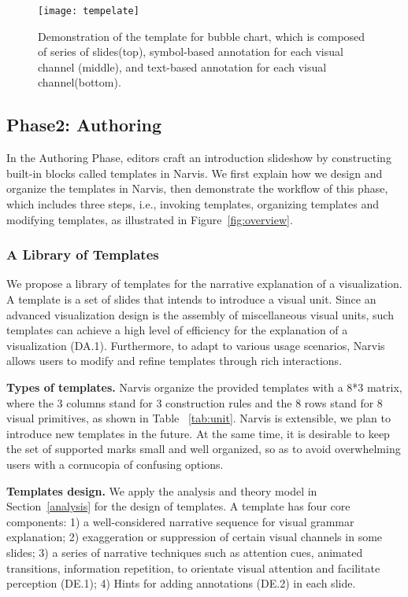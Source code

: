 \begin{figure}
 \centering 
 \texttt{[image: tempelate]}
 \caption{Demonstration of the template for bubble chart, which is composed of series of slides(top), symbol-based annotation for each visual channel (middle), and text-based annotation for each visual channel(bottom). }
 \label{fig:template}
\end{figure}


\subsection{Phase2: Authoring}
In the Authoring Phase, editors craft an introduction slideshow by constructing built-in blocks called templates in Narvis. We first explain how we design and organize the templates in Narvis, then demonstrate the workflow of this phase, which includes three steps, i.e., invoking templates, organizing templates and modifying templates, as illustrated in Figure~\ref{fig:overview}. 

\subsubsection{A Library of Templates}
We propose a library of templates for the narrative explanation of a visualization. A template is a set of slides that intends to introduce a visual unit. Since an advanced visualization design is the assembly of miscellaneous visual units, such templates can achieve a high level of efficiency for the explanation of a visualization (DA.1). Furthermore, to adapt to various usage scenarios, Narvis allows users to modify and refine templates through rich interactions.

\noindent
\textbf{Types of templates.}
Narvis organize the provided templates with a 8*3 matrix, where the 3 columns stand for 3 construction rules and the 8 rows stand for  8 visual primitives, as shown in Table ~\ref{tab:unit}. Narvis is extensible, we plan to introduce new templates in the future. At the same time, it is desirable to keep the set of supported marks small and well organized, so as to avoid overwhelming users with a cornucopia of confusing options.

\noindent
\textbf{Templates design.}
We apply the analysis and theory model in Section~\ref{analysis} for the design of templates. A template has four core components: 1) a well-considered narrative sequence for visual grammar explanation; 2) exaggeration or suppression of certain visual channels in some slides; 3) a series of narrative techniques such as attention cues, animated transitions, information repetition, to orientate visual attention and facilitate perception (DE.1); 4) Hints for adding annotations (DE.2) in each slide. 

